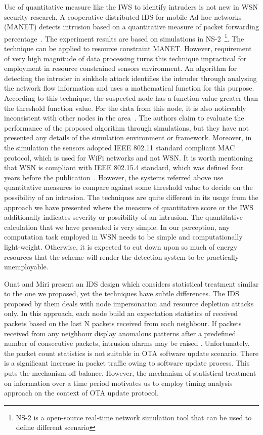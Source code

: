 \documentclass[conference,final]{IEEEtran}
\begin{document}
Use of quantitative measure like the IWS to identify intruders is not new in WSN security research.
A cooperative distributed IDS for mobile Ad-hoc networks (MANET) detects intrusion based on a quantitative measure of packet forwarding percentage~\cite{hua03}.
The experiment results are based on simulations in NS-2~\footnote{NS-2 is a open-source real-time network simulation tool that can be used to define different scenario}.
The technique can be applied to resource constraint MANET.
However, requirement of very high magnitude of data processing turns this technique impractical for employment in resource constrained sensors environment. 
An algorithm for detecting the intruder in sinkhole attack identifies the intruder through analysing the network flow information and uses a mathematical function for this purpose.  According to this technique, the suspected node has a  function  value greater than the threshold function value.
For the data from this node, it is also noticeably inconsistent with other nodes in the area~\cite{ngai07}. 
The authors claim to evaluate the performance of the proposed algorithm through simulations, but they have not presented any details of the simulation environment or framework.
Moreover, in the simulation the sensors adopted IEEE 802.11 standard compliant MAC protocol, which is used for WiFi networks and not WSN.
It is worth mentioning that WSN is compliant with IEEE 802.15.4 standard, which was defined four years before the publication~\cite{893287}.
However, the systems referred above use quantitative measures to compare against some threshold value to decide on  the possibility of an intrusion.
The techniques are quite different in its usage from the approach we have presented where the measure of quantitative score or the IWS additionally indicates severity or possibility of an intrusion.
The quantitative calculation that we have presented is very simple. 
In our perception, any computation task employed in WSN needs to be simple and computationally light-weight.
Otherwise, it is expected to cut down upon  so much of energy resources that the scheme will render the detection system to be practically unemployable.


Onat and Miri present an IDS design which considers statistical treatment similar to the one we proposed, yet the techniques have subtle differences.
The IDS proposed by them deals with node impersonation and resource depletion attacks only.
In this approach, each node build an expectation statistics of received packets based on the last N packets received from each neighbour.
If packets received from any neighbour display anomalous patterns after a predefined number of consecutive packets, intrusion alarms may be raised \cite{1512911}.
Unfortunately, the  packet count statistics is not suitable in OTA software update scenario.
There is a significant increase in packet traffic owing to software update process. 
This puts the mechanism off balance.
However, the mechanism of statistical treatment on information over a time period motivates us to employ timing analysis approach on the context of OTA update protocol.
\end{document}
